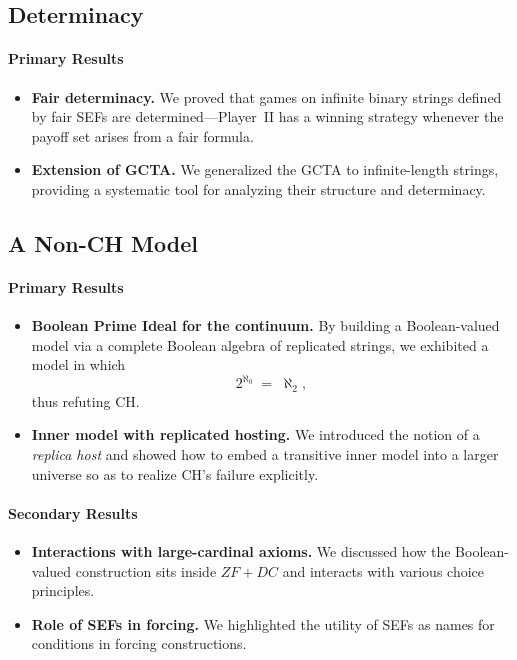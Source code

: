 \subsection*{Determinacy}
\paragraph{Primary Results}
\begin{itemize}
  \item \textbf{Fair determinacy.}  We proved that games on infinite binary strings defined by fair SEFs are determined—Player II has a winning strategy whenever the payoff set arises from a fair formula.  
  \item \textbf{Extension of GCTA.}  We generalized the GCTA to infinite-length strings, providing a systematic tool for analyzing their structure and determinacy.  
\end{itemize}

\subsection*{A Non-CH Model}
\paragraph{Primary Results}
\begin{itemize}
  \item \textbf{Boolean Prime Ideal for the continuum.}  By building a Boolean-valued model via a complete Boolean algebra of replicated strings, we exhibited a model in which
  \[
    2^{\aleph_0} \;=\;\aleph_2,
  \]
  thus refuting CH.  
  \item \textbf{Inner model with replicated hosting.}  We introduced the notion of a \emph{replica host} and showed how to embed a transitive inner model into a larger universe so as to realize CH’s failure explicitly.  
\end{itemize}

\paragraph{Secondary Results}
\begin{itemize}
  \item \textbf{Interactions with large-cardinal axioms.}  We discussed how the Boolean-valued construction sits inside $ZF + DC$ and interacts with various choice principles.  
  \item \textbf{Role of SEFs in forcing.}  We highlighted the utility of SEFs as names for conditions in forcing constructions.  
\end{itemize}

